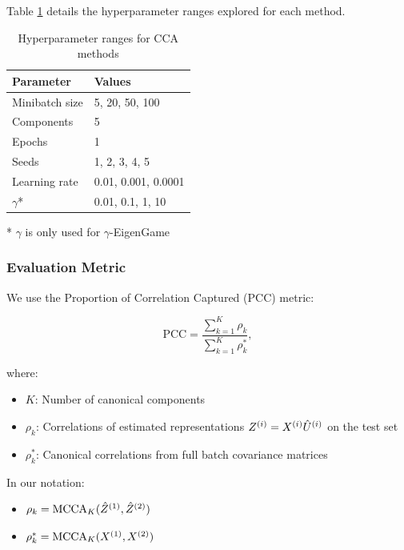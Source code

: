 Table \ref{tab:hyperparameters} details the hyperparameter ranges explored for each method.

\begin{table}[h!]
    \centering
    \caption{Hyperparameter ranges for CCA methods}
    \label{tab:hyperparameters}
    \begin{tabular}{|l|l|}
        \hline
        Parameter             & Values              \\
        \hline
        Minibatch size        & 5, 20, 50, 100      \\
        Components            & 5                   \\
        Epochs                & 1                   \\
        Seeds                 & 1, 2, 3, 4, 5       \\
        Learning rate         & 0.01, 0.001, 0.0001 \\
        $\gamma$*             & 0.01, 0.1, 1, 10    \\
        \hline
    \end{tabular}
    \footnotesize{* $\gamma$ is only used for $\gamma$-EigenGame}
\end{table}

\subsubsection{Evaluation Metric}
We use the Proportion of Correlation Captured (PCC) metric:

\begin{equation}
\text{PCC} = \frac{\sum_{k=1}^K \rho_k}{\sum_{k=1}^K \rho_k^*},
\end{equation}

where:
\begin{itemize}
    \item $K$: Number of canonical components
    \item $\rho_k$: Correlations of estimated representations $Z^{(i)}=X^{(i)}\hat{U}^{(i)}$ on the test set
    \item $\rho_k^*$: Canonical correlations from full batch covariance matrices
\end{itemize}

In our notation:
\begin{itemize}
    \item $\rho_k = \operatorname{MCCA}_K(\hat{Z}^{(1)}, \hat{Z}^{(2)})$
    \item $\rho_k^* = \operatorname{MCCA}_K(X^{(1)}, X^{(2)})$
\end{itemize}

